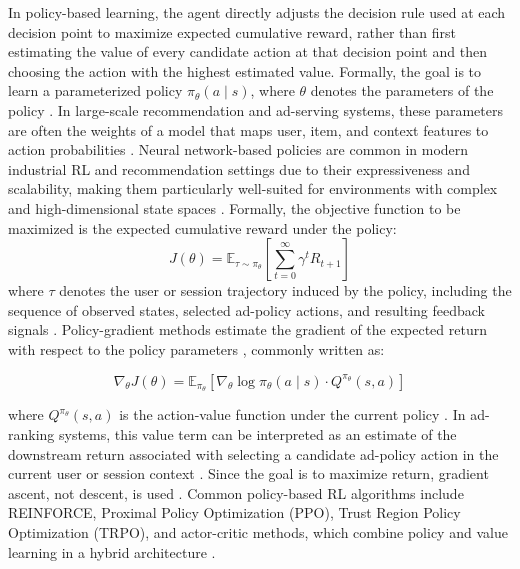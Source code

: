 \documentclass[manuscript,review,screen]{acmart}
\begin{document}
In policy-based learning, the agent directly adjusts the decision rule used at each decision point to maximize expected cumulative reward, rather than first estimating the value of every candidate action at that decision point and then choosing the action with the highest estimated value. Formally, the goal is to learn a parameterized policy \( \pi_\theta(a \mid s) \), where \( \theta \) denotes the parameters of the policy \cite{williams1992simple}. In large-scale recommendation and ad-serving systems, these parameters are often the weights of a model that maps user, item, and context features to action probabilities \cite{chen2022off, zhao2021dear}. Neural network-based policies are common in modern industrial RL and recommendation settings due to their expressiveness and scalability, making them particularly well-suited for environments with complex and high-dimensional state spaces \cite{lin2023survey}. Formally, the objective function to be maximized is the expected cumulative reward under the policy:
\begin{equation}
    J(\theta) = \mathbb{E}_{\tau \sim \pi_\theta} \left[ \sum_{t=0}^{\infty} \gamma^t R_{t+1} \right]
    \label{eq:objective_function}
\end{equation}
where \( \tau \) denotes the user or session trajectory induced by the policy, including the sequence of observed states, selected ad-policy actions, and resulting feedback signals \cite{chen2022off, zhao2021dear}. Policy-gradient methods estimate the gradient of the expected return with respect to the policy parameters \cite{Sutton1998, williams1992simple}, commonly written as:

\begin{equation}
    \nabla_\theta J(\theta) = \mathbb{E}_{\pi_\theta} \left[ \nabla_\theta \log \pi_\theta(a \mid s) \cdot Q^{\pi_\theta}(s, a) \right]
    \label{eq:policy_gradient}
\end{equation}

where \( Q^{\pi_\theta}(s, a) \) is the action-value function under the current policy \cite{Sutton1998}. In ad-ranking systems, this value term can be interpreted as an estimate of the downstream return associated with selecting a candidate ad-policy action in the current user or session context \cite{chen2022off, zhao2021dear}. Since the goal is to maximize return, gradient ascent, not descent, is used \cite{williams1992simple}. Common policy-based RL algorithms include REINFORCE, Proximal Policy Optimization (PPO), Trust Region Policy Optimization (TRPO), and actor-critic methods, which combine policy and value learning in a hybrid architecture \cite{williams1992simple, schulman2015trust, schulman2017proximal, mnih2016asynchronous}.
\end{document}
